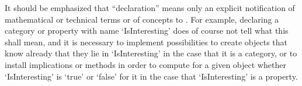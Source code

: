 It should be emphasized that ``declaration'' means only an explicit
notification of mathematical or technical terms or of concepts to {\GAP}.
For example, declaring a category or property with name `IsInteresting'
does of course not tell {\GAP} what this shall mean,
and it is necessary to implement possibilities to create objects that
know already that they lie in `IsInteresting' in the case that it is a
category, or to install implications or methods in order to
compute for a given object whether `IsInteresting' is `true' or `false'
for it in the case that `IsInteresting' is a property.



